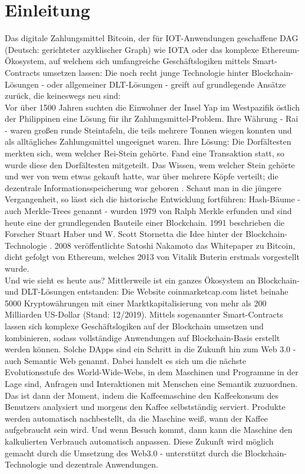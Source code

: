 \chapter{Einleitung}
\label{ch:intro}
Das digitale Zahlungsmittel Bitcoin, der für \ac{IOT}-Anwen\-dungen geschaffene \ac{DAG} (Deutsch: gerichteter azyklischer Graph) wie IOTA oder das komplexe Ethereum-Ökosystem, auf welchem sich umfangreiche Geschäftslogiken mittels Smart-Contracts umsetzen lassen: Die noch recht junge Technologie hinter Block\-chain-Lösungen - oder allgemeiner \ac{DLT}-Lösungen - greift auf grundlegende Ansätze zurück, die keineswegs neu sind:\\
Vor über 1500 Jahren suchten die Einwohner der Insel Yap im Westpazifik östlich der Philippinen eine Lösung für ihr Zahlungsmittel-Problem. Ihre Währung - Rai - waren großen runde Steintafeln, die teils mehrere Tonnen wiegen konnten und als alltägliches Zahlungsmittel ungeeignet waren. Ihre Lösung: Die Dorfältesten merkten sich, wem welcher Rei-Stein gehörte. Fand eine Transaktion statt, so wurde diese den Dorfältesten mitgeteilt. Das Wissen, wem welcher Stein gehörte und wer von wem etwas gekauft hatte, war über mehrere Köpfe verteilt; die dezentrale Informationsspeicherung war geboren \cite{forbes2018}. Schaut man in die jüngere Vergangenheit, so lässt sich die historische Entwicklung fortführen: Hash-Bäume - auch Merkle-Trees genannt -  wurden 1979 von Ralph Merkle erfunden und sind heute eine der grundlegenden Bauteile einer Blockchain. 1991 beschrieben die Forscher Stuart Haber und W. Scott Stornetta die Idee hinter der Blockchain-Technologie \cite{binance2019}. 2008 veröffentlichte Satoshi Nakamoto das Whitepaper zu Bitcoin, dicht gefolgt von Ethereum, welches 2013 von Vitalik Buterin erstmals vorgestellt wurde.\\
Und wie sieht es heute aus? Mittlerweile ist ein ganzes Ökosystem an Block\-chain- und \ac{DLT}-Lösungen entstanden: Die Website coinmarketcap.com listet beinahe 5000 Kryptowährungen mit einer Marktkapitalisierung von mehr als 200 Milliarden US-Dollar (Stand: 12/2019). Mittels sogenannter Smart-Contracts lassen sich komplexe Geschäftslogiken auf der Blockchain umsetzen und kombinieren, sodass vollständige Anwendungen auf Blockchain-Basis erstellt werden können. Solche \ac{DApp}s sind ein Schritt in die Zukunft hin zum Web 3.0 - auch Semantic Web genannt. Dabei handelt es sich um die nächste Evolutionsstufe des World-Wide-Webs, in dem Maschinen und Programme in der Lage sind, Anfragen und Interaktionen mit Menschen eine Semantik zuzuordnen. Das ist dann der Moment, indem die Kaffeemaschine den Kaffeekonsum des Benutzers analysiert und morgens den Kaffee selbstständig serviert. Produkte werden automatisch nachbestellt, da die Maschine weiß, wann der Kaffee aufgebraucht sein wird. Und wenn Besuch kommt, dann kann die Maschine den kalkulierten Verbrauch automatisch anpassen. Diese Zukunft wird möglich gemacht durch die Umsetzung des Web3.0 - unterstützt durch die Blockchain-Technologie und dezentrale Anwendungen.

